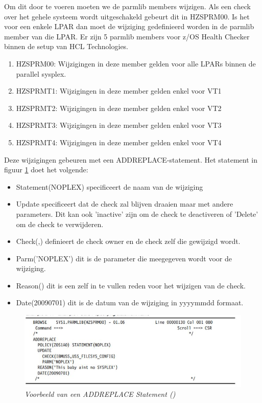 Om dit door te voeren moeten we de parmlib members wijzigen. Als een check over het gehele systeem wordt uitgeschakeld gebeurt dit in HZSPRM00. Is het voor een enkele LPAR dan moet de wijziging gedefinieerd worden in de parmlib member van die LPAR. Er zijn 5 parmlib members voor z/OS Health Checker binnen de setup van HCL Technologies.

\begin{enumerate}
	\item HZSPRM00: Wijzigingen in deze member gelden voor alle LPARs binnen de parallel sysplex.
	\item HZSPRMT1: Wijzigingen in deze member gelden enkel voor VT1
	\item HZSPRMT2: Wijzigingen in deze member gelden enkel voor VT2
	\item HZSPRMT3: Wijzigingen in deze member gelden enkel voor VT3
	\item HZSPRMT4: Wijzigingen in deze member gelden enkel voor VT4
\end{enumerate}

Deze wijzigingen gebeuren met een ADDREPLACE-statement. Het statement in figuur \ref{fig:addreplace} doet het volgende:

\begin{itemize}
	\item Statement(NOPLEX) specificeert de naam van de wijziging
	\item Update specificeert dat de check zal blijven draaien maar met andere parameters. Dit kan ook 'inactive' zijn om de check te deactiveren of 'Delete' om de check te verwijderen.
	\item Check(,) definieert de check owner en de check zelf die gewijzigd wordt.
	\item Parm('NOPLEX') dit is de parameter die meegegeven wordt voor de wijziging.
	\item Reason() dit is een zelf in te vullen reden voor het wijzigen van de check.
	\item Date(20090701) dit is de datum van de wijziging in yyyymmdd formaat. \cite{Bezzi2010}
\end{itemize}

\begin{figure}[h]
	\centering
	\includegraphics{img/addreplace}
	\caption[ADDREPLACE statement]{{\small \textit{Voorbeeld van een ADDREPLACE Statement (\cite{IBMCorporation2019})}}}
	\label{fig:addreplace}
\end{figure}

